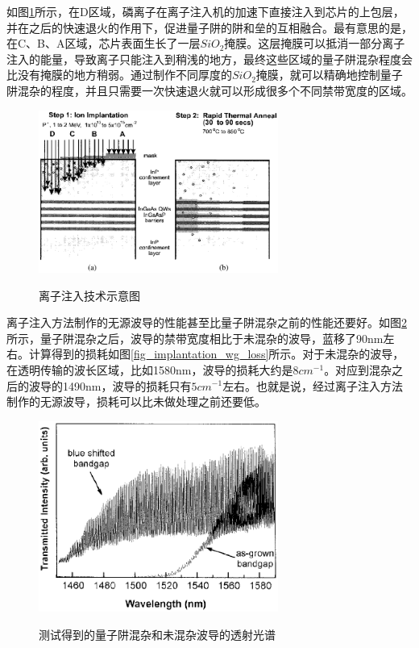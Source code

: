 \documentclass{ZJUthesis}
\begin{document}
如图\ref{fig_implantation}所示，在D区域，磷离子在离子注入机的加速下直接注入到芯片的上包层，并在之后的快速退火的作用下，促进量子阱的阱和垒的互相融合。最有意思的是，在C、B、A区域，芯片表面生长了一层$SiO_2$掩膜。这层掩膜可以抵消一部分离子注入的能量，导致离子只能注入到稍浅的地方，最终这些区域的量子阱混杂程度会比没有掩膜的地方稍弱。通过制作不同厚度的$SiO_2$掩膜，就可以精确地控制量子阱混杂的程度，并且只需要一次快速退火就可以形成很多个不同禁带宽度的区域。

\begin{figure}[!ht]
  \centering
  \includegraphics[width=0.7\textwidth]{./Pictures/implantation.eps}\\
  \caption{离子注入技术示意图}
  \label{fig_implantation}
\end{figure}

离子注入方法制作的无源波导的性能甚至比量子阱混杂之前的性能还要好。如图\ref{fig_implantation_wg_test}所示，量子阱混杂之后，波导的禁带宽度相比于未混杂的波导，蓝移了90nm左右。计算得到的损耗如图\ref{fig_implantation_wg_loss}所示。对于未混杂的波导，在透明传输的波长区域，比如1580nm，波导的损耗大约是$8cm^{-1}$。对应到混杂之后的波导的1490nm，波导的损耗只有$5cm^{-1}$左右。也就是说，经过离子注入方法制作的无源波导，损耗可以比未做处理之前还要低。

\begin{figure}[!ht]
  \centering
  \includegraphics[width=0.7\textwidth]{./Pictures/implantation_wg_test.eps}\\
  \caption{测试得到的量子阱混杂和未混杂波导的透射光谱}
  \label{fig_implantation_wg_test}
\end{figure}
\end{document}
